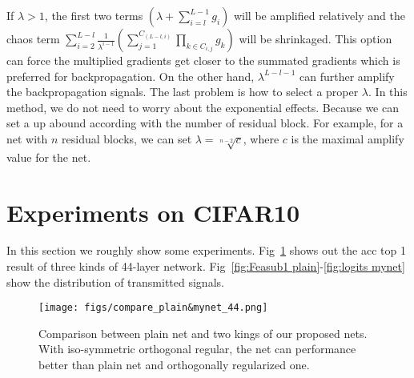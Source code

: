 \documentclass[]{article}
\begin{document}
If $\lambda>1$, the first two terms $(\lambda+\sum_{i=l}^{L-1}g_{i})$ will be amplified relatively and the chaos term $\sum_{i=2}^{L-l}\frac{1}{\lambda^{i-1}}(\sum_{j=1}^{C_{(L-l,i)}}\prod_{k\in C_{i,j}}g_{k})$ will be shrinkaged. This option can force the multiplied gradients get closer to the summated gradients which is preferred for backpropagation. On the other hand, $\lambda^{L-l-1}$ can further amplify the backpropagation signals. The last problem is how to select a proper $\lambda$. In this method, we do not need to worry about the exponential effects. Because we can set a up abound according with the number of residual block. For example, for a net with $n$ residual blocks, we can set $\lambda=\sqrt[n-2]{c}$, where $c$ is the maximal amplify value for the net. 


\section{Experiments on CIFAR10}
In this section we roughly show some experiments. Fig~\ref{compare_44} shows out the acc top 1 result of three kinds of 44-layer network. Fig~\ref{fig:Feasub1 plain}-\ref{fig:logits mynet} show the distribution of transmitted signals.

\begin{figure}
  \centering
  \texttt{[image: figs/compare\_plain\&mynet\_44.png]}\\
  \caption{Comparison between plain net and two kings of our proposed nets. With iso-symmetric orthogonal regular, the net can performance better than plain net and orthogonally regularized one.}\label{compare_44}
\end{figure}
\end{document}
